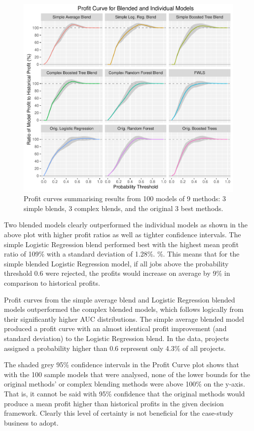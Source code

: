 \documentclass[]{elsarticle} %
\makeatletter
\def\maxwidth{\ifdim\Gin@nat@width>\linewidth\linewidth
\else\Gin@nat@width\fi}
\let\Oldincludegraphics\includegraphics
\renewcommand{\includegraphics}[1]{\Oldincludegraphics[width=\maxwidth]{#1}}
\makeatother
\begin{document}
\begin{figure}[htbp]
\centering
\includegraphics{Consulting_Profitability_Paper_files/figure-latex/profit_curve-1.pdf}
\caption{Profit curves summarising results from 100 models of 9 methods:
3 simple blends, 3 complex blends, and the original 3 best methods.}
\end{figure}

Two blended models clearly outperformed the individual models as shown
in the above plot with higher profit ratios as well as tighter
confidence intervals. The simple Logistic Regression blend performed
best with the highest mean profit ratio of 109\% with a standard
deviation of 1.28\%. \%. This means that for the simple blended Logistic
Regression model, if all jobs above the probability threshold 0.6 were
rejected, the profits would increase on average by 9\% in comparison to
historical profits.

Profit curves from the simple average blend and Logistic Regression
blended models outperformed the complex blended models, which follows
logically from their significantly higher AUC distributions. The simple
average blended model produced a profit curve with an almost identical
profit improvement (and standard deviation) to the Logistic Regression
blend. In the data, projects assigned a probability higher than 0.6
represent only 4.3\% of all projects.

The shaded grey 95\% confidence intervals in the Profit Curve plot shows
that with the 100 sample models that were analysed, none of the lower
bounds for the original methods' or complex blending methods were above
100\% on the y-axis. That is, it cannot be said with 95\% confidence
that the original methods would produce a mean profit higher than
historical profits in the given decision framework. Clearly this level
of certainty is not beneficial for the case-study business to adopt.
\end{document}
